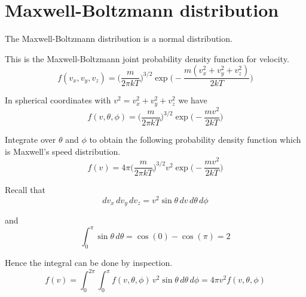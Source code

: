 

\section*{Maxwell-Boltzmann distribution}

The Maxwell-Boltzmann distribution is a normal distribution.

\bigskip
This is the Maxwell-Boltzmann joint probability density function for velocity.
\begin{equation*}
f(v_x,v_y,v_z)=
\biggl(\frac{m}{2\pi kT}\biggr)^{3/2}
\exp\biggl(-\frac{m(v_x^2+v_y^2+v_z^2)}{2kT}\biggr)
\end{equation*}

In spherical coordinates with $v^2=v_x^2+v_y^2+v_z^2$ we have
\begin{equation*}
f(v,\theta,\phi)=
\biggl(\frac{m}{2\pi kT}\biggr)^{3/2}
\exp\biggl(-\frac{mv^2}{2kT}\biggr)
\end{equation*}

Integrate over $\theta$ and $\phi$
to obtain the following probability density function
which is Maxwell's speed distribution.
\begin{equation*}
f(v)=4\pi\biggl(\frac{m}{2\pi kT}\biggr)^{3/2}
v^2\exp\biggl(-\frac{mv^2}{2kT}\biggr)
\end{equation*}

Recall that
\begin{equation*}
dv_x\,dv_y\,dv_z=v^2\sin\theta\,dv\,d\theta\,d\phi
\end{equation*}

and
\begin{equation*}
\int_0^\pi\sin\theta\,d\theta=\cos(0)-\cos(\pi)=2
\end{equation*}

Hence the integral can be done by inspection.
\begin{equation*}
f(v)=\int_0^{2\pi}\int_0^\pi f(v,\theta,\phi)\,v^2\sin\theta\,d\theta\,d\phi
=4\pi v^2f(v,\theta,\phi)
\end{equation*}



